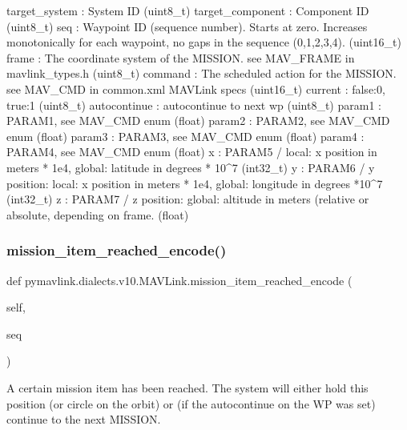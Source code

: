 \begin{DoxyVerb}
\begin{DoxyVerb}
\begin{DoxyVerb}
\begin{DoxyVerb}
\begin{DoxyVerb}
target_system             : System ID (uint8_t)
target_component          : Component ID (uint8_t)
seq                       : Waypoint ID (sequence number). Starts at zero. Increases monotonically for each waypoint, no gaps in the sequence (0,1,2,3,4). (uint16_t)
frame                     : The coordinate system of the MISSION. see MAV_FRAME in mavlink_types.h (uint8_t)
command                   : The scheduled action for the MISSION. see MAV_CMD in common.xml MAVLink specs (uint16_t)
current                   : false:0, true:1 (uint8_t)
autocontinue              : autocontinue to next wp (uint8_t)
param1                    : PARAM1, see MAV_CMD enum (float)
param2                    : PARAM2, see MAV_CMD enum (float)
param3                    : PARAM3, see MAV_CMD enum (float)
param4                    : PARAM4, see MAV_CMD enum (float)
x                         : PARAM5 / local: x position in meters * 1e4, global: latitude in degrees * 10^7 (int32_t)
y                         : PARAM6 / y position: local: x position in meters * 1e4, global: longitude in degrees *10^7 (int32_t)
z                         : PARAM7 / z position: global: altitude in meters (relative or absolute, depending on frame. (float)\end{DoxyVerb}
 \mbox{\label{classpymavlink_1_1dialects_1_1v10_1_1MAVLink_a9e6deb675dcc78a8d1ed7216d567fc8b}} 
\subsubsection{\texorpdfstring{mission\+\_\+item\+\_\+reached\+\_\+encode()}{mission\_item\_reached\_encode()}}
{\footnotesize\ttfamily def pymavlink.\+dialects.\+v10.\+M\+A\+V\+Link.\+mission\+\_\+item\+\_\+reached\+\_\+encode (\begin{DoxyParamCaption}\item[{}]{self,  }\item[{}]{seq }\end{DoxyParamCaption})}

\begin{DoxyVerb}A certain mission item has been reached. The system will either hold
this position (or circle on the orbit) or (if the
autocontinue on the WP was set) continue to the next
MISSION.


\end{DoxyVerb}
\end{DoxyVerb}
\end{DoxyVerb}
\end{DoxyVerb}
\end{DoxyVerb}
